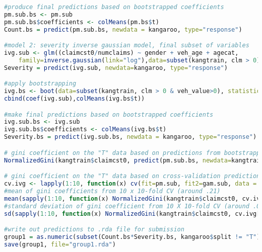 \documentclass[a4paper]{article}\usepackage[]{graphicx}\usepackage[]{color}
\begin{document}
\begin{lstlisting}[language=R]
#produce final predictions based on bootstrapped coefficients
pm.sub.bs <- pm.sub
pm.sub.bs$coefficients <- colMeans(pm.bs$t)
Count.bs = predict(pm.sub.bs, newdata = kangaroo, type="response")

#model 2: severity inverse gaussian model, final subset of variables
ivg.sub <- glm((claimcst0/numclaims) ~ gender + veh_age + agecat,
	family=inverse.gaussian(link="log"),data=subset(kangtrain, clm > 0))
Severity = predict(ivg.sub, newdata=kangaroo, type="response")

#apply bootstrapping
ivg.bs <- boot(data=subset(kangtrain, clm > 0 & veh_value>0), statistic=bs, R=500, formula=formula(ivg.sub), family=inverse.gaussian(link="log"), parallel="multicore")
cbind(coef(ivg.sub),colMeans(ivg.bs$t))

#make final predictions based on bootstrapped coefficients
ivg.sub.bs <- ivg.sub
ivg.sub.bs$coefficients <- colMeans(ivg.bs$t)
Severity.bs = predict(ivg.sub.bs, newdata = kangaroo, type="response")

# gini coefficient on the "T" data based on predictions from bootstrapped models 
NormalizedGini(kangtrain$claimcst0, predict(pm.sub.bs, newdata=kangtrain, type="response")*predict(ivg.sub.bs, newdata=kangtrain, type="response"))

# gini coefficient on the "T" data based on cross-validation predictions, performed 10 times (10 x 10-fold CV)
cv.ivg <- lapply(1:10, function(x) cv(fit=pm.sub, fit2=gam.sub, data = kangtrain, data2=subset(kangtrain, clm>0), K=10))
#mean of gini coefficients from 10 x 10-fold CV (around .21)
mean(sapply(1:10, function(x) NormalizedGini(kangtrain$claimcst0, cv.ivg[[x]])))
#standard deviation of gini coefficient from 10 X 10-fold CV (around .002)
sd(sapply(1:10, function(x) NormalizedGini(kangtrain$claimcst0, cv.ivg[[x]])))

#write out predictions to .rda file for submission
group1 = as.numeric(subset(Count.bs*Severity.bs, kangaroo$split != "T"))
save(group1, file="group1.rda")
\end{lstlisting}
\end{document}
